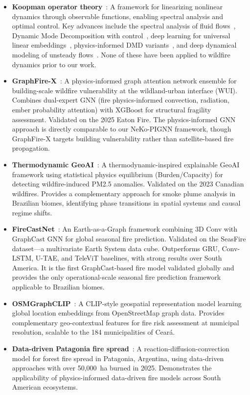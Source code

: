 \documentclass[5p,twocolumn]{elsarticle}
\begin{document}
\begin{itemize}
  \item \textbf{Koopman operator theory}~\cite{koopman1931,brunton2022}: A framework for linearizing nonlinear dynamics through observable functions, enabling spectral analysis and optimal control. Key advances include the spectral analysis of fluid flows~\cite{rowley2009,mezic2013}, Dynamic Mode Decomposition with control~\cite{proctor2016}, deep learning for universal linear embeddings~\cite{lusch2018,takeishi2017}, physics-informed DMD variants~\cite{baddoo2023}, and deep dynamical modeling of unsteady flows~\cite{morton2019}. None of these have been applied to wildfire dynamics prior to our work.\\
  \item \textbf{GraphFire-X}~\cite{esparza2025}: A physics-informed graph attention network ensemble for building-scale wildfire vulnerability at the wildland-urban interface (WUI). Combines dual-expert GNN (fire physics-informed convection, radiation, ember probability attention) with XGBoost for structural fragility assessment. Validated on the 2025 Eaton Fire. The physics-informed GNN approach is directly comparable to our NeKo-PIGNN framework, though GraphFire-X targets building vulnerability rather than satellite-based fire propagation.
  \item \textbf{Thermodynamic GeoAI}~\cite{lim2026}: A thermodynamic-inspired explainable GeoAI framework using statistical physics equilibrium (Burden/Capacity) for detecting wildfire-induced PM2.5 anomalies. Validated on the 2023 Canadian wildfires. Provides a complementary approach for smoke plume analysis in Brazilian biomes, identifying phase transitions in spatial systems and causal regime shifts.
  \item \textbf{FireCastNet}~\cite{michail2025}: An Earth-as-a-Graph framework combining 3D Conv with GraphCast GNN for global seasonal fire prediction. Validated on the SeasFire dataset---a multivariate Earth System data cube. Outperforms GRU, Conv-LSTM, U-TAE, and TeleViT baselines, with strong results over South America. It is the first GraphCast-based fire model validated globally and provides the only operational-scale seasonal fire prediction framework applicable to Brazilian biomes.
  \item \textbf{OSMGraphCLIP}~\cite{michail2026_osm}: A CLIP-style geospatial representation model learning global location embeddings from OpenStreetMap graph data. Provides complementary geo-contextual features for fire risk assessment at municipal resolution, scalable to the 184 municipalities of Cear\'{a}.
  \item \textbf{Data-driven Patagonia fire spread}~\cite{becerra2026}: A reaction-diffusion-convection model for forest fire spread in Patagonia, Argentina, using data-driven approaches with over 50,000~ha burned in 2025. Demonstrates the applicability of physics-informed data-driven fire models across South American ecosystems.
\end{itemize}
\end{document}
